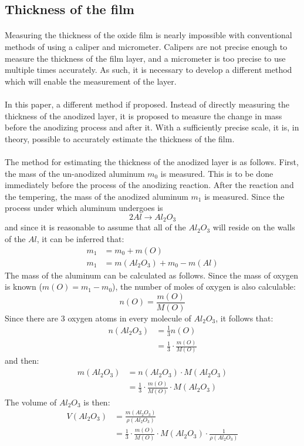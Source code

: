 \documentclass[a4paper]{article}
\begin{document}
\subsection{Thickness of the film}

\paragraph*{}
Measuring the thickness of the oxide film is nearly impossible with
conventional methods of using a caliper and micrometer. Calipers are not
precise enough to measure the thickness of the film layer, and a micrometer is
too precise to use multiple times accurately. As such, it is necessary to
develop a different method which will enable the measurement of the layer.

\paragraph*{}
In this paper, a different method if proposed. Instead of directly measuring
the thickness of the anodized layer, it is proposed to measure the change in
mass before the anodizing process and after it. With a sufficiently precise
scale, it is, in theory, possible to accurately estimate the thickness of the
film.

\paragraph*{}
The method for estimating the thickness of the anodized layer is as follows.
First, the mass of the un-anodized aluminum $m_0$ is measured. This is to be
done immediately before the process of the anodizing reaction. After the
reaction and the tempering, the mass of the anodized aluminum $m_1$ is
measured. Since the process under which aluminum undergoes is
$$2Al \rightarrow Al_2O_3$$
and since it is reasonable to assume that all of the $Al_2O_3$ will reside on
the walls of the $Al$, it can be inferred that:
\begin{align*}
  m_1 &= m_0 + m(O) \\
  m_1 &= m(Al_2O_3) + m_0 - m(Al)
\end{align*}
The mass of the aluminum can be calculated as follows. Since the mass of oxygen
is known ($m(O) = m_1 - m_0$), the number of moles of oxygen is also
calculable:
$$n(O) = \frac{m(O)}{M(O)}$$
Since there are $3$ oxygen atoms in every molecule of $Al_2O_3$, it follows
that:
\begin{align*}
  n(Al_2O_3) &= \frac{1}{3} n(O) \\
  &= \frac{1}{3} \cdot \frac{m(O)}{M(O)}
\end{align*}
and then:
\begin{align*}
  m(Al_2O_3) &= n(Al_2O_3) \cdot M(Al_2O_3) \\
  &= \frac{1}{3} \cdot \frac{m(O)}{M(O)} \cdot M(Al_2O_3)
\end{align*}
The volume of $Al_2O_3$ is then:
\begin{align*}
  V(Al_2O_3) &= \frac{m(Al_2O_3)}{\rho(Al_2O_3)} \\
  &= \frac{1}{3} \cdot \frac{m(O)}{M(O)} \cdot M(Al_2O_3) \cdot
    \frac{1}{\rho(Al_2O_3)}
\end{align*}
\end{document}
